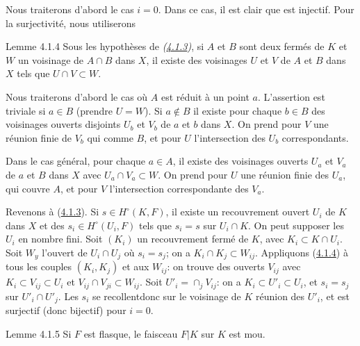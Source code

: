 \documentclass[10pt]{../fichiers-configuration-latex/smfart}
\begin{document}
Nous traiterons d'abord le cas $i = 0$. Dans ce cas, il est clair que
 est injectif. Pour la surjectivité, nous utiliserons

\begin{enonce*}{Lemme 4.1.4}
Sous les hypothèses de \emph{(\hyperref[Vbis.lem4.1.3]{4.1.3})}, si $A$ et $B$ sont deux fermés de $K$
et $W$ un voisinage de $A \cap B$ dans $X$, il existe des voisinages
$U$ et $V$ de $A$ et $B$ dans $X$ tels que $U \cap V \subset W$.
\end{enonce*}

Nous traiterons d'abord le cas où $A$ est réduit à un point
$a$. L'assertion est triviale si $a \in B$ (prendre $U = W$). Si $a
\not \in B$ il existe pour chaque $b \in B$ des voisinages ouverts
disjoints $U_b$ et $V_b$ de $a$ et $b$ dans $X$. On prend pour $V$ une
réunion finie de $V_b$ qui comme $B$, et pour $U$ l'intersection des
$U_b$ correspondants.

Dans le cas général, pour chaque $a \in A$, il existe des voisinages
ouverts $U_a$ et $V_a$ de $a$ et $B$ dans $X$ avec $U_a \cap V_a
\subset W$. On prend pour $U$ une réunion finie des $U_a$, qui couvre
$A$, et pour $V$ l'intersection correspondante des $V_a$.

Revenons à (\hyperref[Vbis.lem4.1.3]{4.1.3}). Si $s \in H^{\circ}(K, F)$, il existe un
recouvrement ouvert $U_i$ de $K$ dans $X$ et des $s_i \in H^{\circ}
(U_i, F)$ tels que $s_i = s$  sur $U_i \cap K$. On peut supposer les
$U_i$ en nombre fini. Soit $(K_i)$ un recouvrement fermé de $K$, avec
$K_i \subset K \cap U_i$. Soit $W_y$ l'ouvert de $U_i \cap U_j$ où
$s_i = s_j$; on a $K_i \cap K_j \subset W_{ij}$. Appliquons (\hyperref[Vbis.lem4.1.4]{4.1.4}) à
tous les couples $(K_i, K_j)$ et aux $W_{ij}$: on trouve des ouverts
$V_{ij}$ avec $K_i \subset V_{ij} \subset U_i$ et $V_{ij} \cap V_{ji}
\subset W_{ij}$. Soit $U'_i = \displaystyle\mathop{\cap}_j
  V_{ij}$: on a $K_i \subset U'_i \subset U_i$, et $s_i = s_j$ sur
  $U'_i \cap U'_j$. Les $s_i$ se recollent\pageoriginale donc sur
  le voisinage
  de $K$ réunion des $U'_i$, et  est surjectif (donc
  bijectif) pour $i = 0$.

\begin{enonce*}{Lemme 4.1.5}
Si $F$ est flasque, le faisceau $F | K$ sur $K$ est mou.
\end{enonce*}
\end{document}
